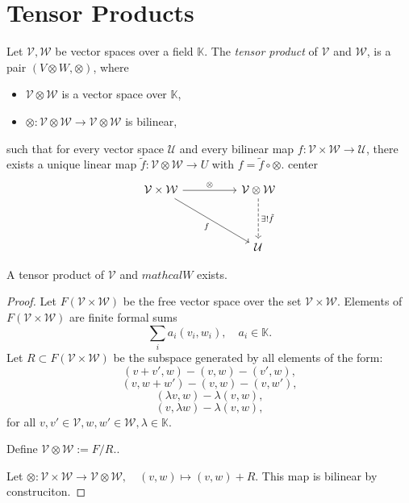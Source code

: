 \section{Tensor Products}
\begin{definition}
    Let \(\mathcal{V}, \mathcal{W}\) be vector spaces over a field \(\mathbb{K}\). The \emph{tensor product} of \(\mathcal{V}\) and \(\mathcal{W}\), is a pair \((V \otimes W, \otimes)\), where 
    \begin{itemize}
        \item \(\mathcal{V} \otimes \mathcal{W}\) is a vector space over \(\mathbb{K}\),
        \item \(\otimes: \mathcal{V} \otimes \mathcal{W} \longrightarrow \mathcal{V} \otimes \mathcal{W}\) is bilinear,
    \end{itemize}
    such that for every vector space \(\mathcal{U}\) and every bilinear map \(f:\mathcal{V} \times \mathcal{W} \longrightarrow \mathcal{U}\), there exists a unique linear map \(\tilde{f}: \mathcal{V} \otimes \mathcal{W} \longrightarrow U\) with \(f = \tilde{f} \circ \otimes\).
center\[\begin{tikzcd}
    {\mathcal{V} \times \mathcal{W}} && {\mathcal{V} \otimes \mathcal{W}} \\
	\\
                                     && \mathcal{U}
	\arrow["\otimes", from=1-1, to=1-3]
	\arrow["f"', from=1-1, to=3-3]
	\arrow["{\exists!\tilde{f}}", dashed, from=1-3, to=3-3]
\end{tikzcd}\]
\end{definition}
\begin{theorem}
    A tensor product of \(\mathcal{V}\) and \(mathcal{W}\) exists.
\end{theorem}
\begin{proof}
    Let \(F(\mathcal{V} \times \mathcal{W})\) be the free vector space over the set \(\mathcal{V} \times \mathcal{W}\). Elements of \(F(\mathcal{V} \times \mathcal{W})\) are finite formal sums \[\sum_i a_i(v_i, w_i), \quad a_i \in \mathbb{K}.\]
    Let \(R \subset F(\mathcal{V} \times \mathcal{W})\) be the subspace generated by all elements of the form:
    \[(v + v', w) - (v, w) - (v', w),\]
    \[(v, w + w') - (v, w) - (v, w'),\]
    \[(\lambda v, w) - \lambda(v, w),\]
    \[(v, \lambda w) - \lambda(v, w),\] for all \(v, v' \in \mathcal{V}, w, w' \in \mathcal{W}, \lambda \in \mathbb{K}\).
    
    Define \(\mathcal{V} \otimes \mathcal{W} := F/R.\). 

    Let \(\otimes: \mathcal{V} \times \mathcal{W} \longrightarrow \mathcal{V} \otimes \mathcal{W}, \quad (v, w) \mapsto (v,w) + R\). This map is bilinear by construciton.
\end{proof}
